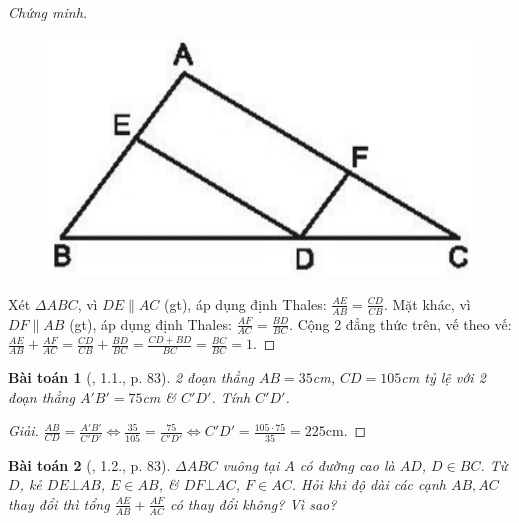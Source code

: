 \documentclass{article}
\newtheorem{baitoan}{Bài toán}
\begin{document}
\begin{proof}[Chứng minh]
	\begin{figure}[H]
		\centering
		\includegraphics[scale=0.2]{SBT_Toan_8_43}
	\end{figure}
	Xét $\Delta ABC$, vì $DE\parallel AC$ (gt), áp dụng định Thales: $\frac{AE}{AB} = \frac{CD}{CB}$. Mặt khác, vì $DF\parallel AB$ (gt), áp dụng định Thales: $\frac{AF}{AC} = \frac{BD}{BC}$. Cộng 2 đẳng thức trên, vế theo vế: $\frac{AE}{AB} + \frac{AF}{AC} = \frac{CD}{CB} + \frac{BD}{BC} = \frac{CD + BD}{BC} = \frac{BC}{BC} = 1$.
\end{proof}

\begin{baitoan}[\cite{SBT_Toan_8_tap_2}, 1.1., p. 83]
	2 đoạn thẳng $AB = 35$\emph{cm}, $CD = 105$\emph{cm} tỷ lệ với 2 đoạn thẳng $A'B' = 75$\emph{cm} \& $C'D'$. Tính $C'D'$.
\end{baitoan}

\begin{proof}[Giải]
	$\frac{AB}{CD} = \frac{A'B'}{C'D'}\Leftrightarrow\frac{35}{105} = \frac{75}{C'D'}\Leftrightarrow C'D' = \frac{105\cdot75}{35} = 225$cm.
\end{proof}

\begin{baitoan}[\cite{SBT_Toan_8_tap_2}, 1.2., p. 83]
	$\Delta ABC$ vuông tại $A$ có đường cao là $AD$, $D\in BC$. Từ $D$, kẻ $DE\bot AB$, $E\in AB$, \& $DF\bot AC$, $F\in AC$. Hỏi khi độ dài các cạnh $AB,AC$ thay đổi thì tổng $\frac{AE}{AB} + \frac{AF}{AC}$ có thay đổi không? Vì sao?
\end{baitoan}
\end{document}
